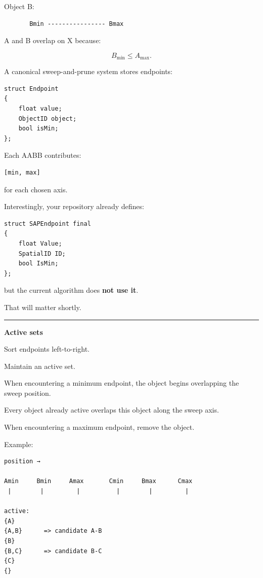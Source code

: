 Object B:

\begin{verbatim}
       Bmin ---------------- Bmax
\end{verbatim}

A and B overlap on X because:

\[
B_{\min}\le A_{\max}.
\]

A canonical sweep-and-prune system stores endpoints:

\begin{verbatim}
struct Endpoint
{
    float value;
    ObjectID object;
    bool isMin;
};
\end{verbatim}

Each AABB contributes:

\begin{verbatim}
[min, max]
\end{verbatim}

for each chosen axis.

Interestingly, your repository already defines:

\begin{verbatim}
struct SAPEndpoint final
{
    float Value;
    SpatialID ID;
    bool IsMin;
};
\end{verbatim}

but the current algorithm does \textbf{not use it}.

That will matter shortly.

\begin{center}\rule{0.5\linewidth}{0.5pt}\end{center}

\textbf{Active sets}

Sort endpoints left-to-right.

Maintain an active set.

When encountering a minimum endpoint, the object begins overlapping the sweep position.

Every object already active overlaps this object along the sweep axis.

When encountering a maximum endpoint, remove the object.

Example:

\begin{verbatim}
position →

Amin     Bmin     Amax       Cmin     Bmax      Cmax
 |        |         |          |        |         |

active:
{A}
{A,B}      => candidate A-B
{B}
{B,C}      => candidate B-C
{C}
{}
\end{verbatim}

